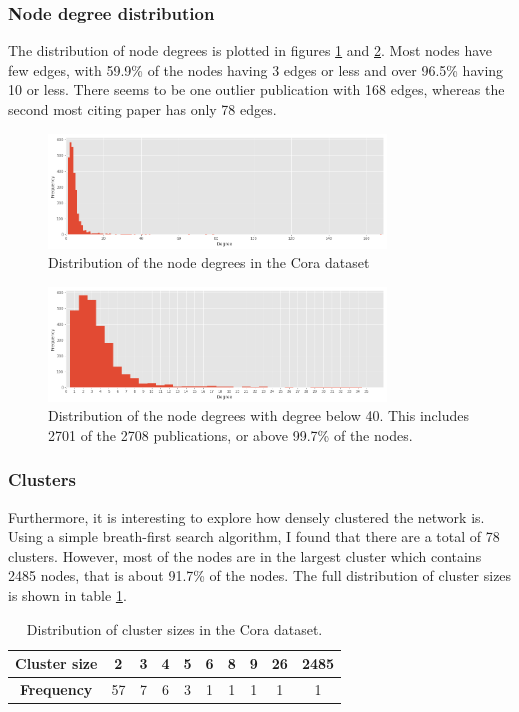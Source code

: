 \documentclass[12pt]{article}
\theoremstyle{definition}
\begin{document}
\subsubsection{Node degree distribution}
The distribution of node degrees is plotted in figures \ref{fig/node_degrees} and \ref{fig/node_degrees_truncated}. Most nodes have few edges, with 59.9\% of the nodes having 3 edges or less and over 96.5\% having 10 or less. There seems to be one outlier publication with 168 edges, whereas the second most citing paper has only 78 edges.

\begin{figure}[H]
	\includegraphics[width=0.8\textwidth]{node_degrees}
	\centering
	\caption{Distribution of the node degrees in the Cora dataset}
	\label{fig/node_degrees}
\end{figure}

\begin{figure}[H]
	\includegraphics[width=0.8\textwidth]{node_degrees_truncated}
	\centering
	\caption{Distribution of the node degrees with degree below 40. This includes 2701 of the 2708 publications, or above 99.7\% of the nodes.}
	\label{fig/node_degrees_truncated}
\end{figure}

\subsubsection{Clusters}
Furthermore, it is interesting to explore how densely clustered the network is. Using a simple breath-first search algorithm, I found that there are a total of 78 clusters. However, most of the nodes are in the largest cluster which contains 2485 nodes, that is about 91.7\% of the nodes. The full distribution of cluster sizes is shown in table \ref{table/cluster_sizes}.
\begin{table}[h]
\centering	
{\renewcommand{\arraystretch}{1.4} %
\begin{tabular}{ c | c c c c c c c c c}
\textbf{Cluster size} & 2  & 3 & 4 & 5 & 6 & 8 & 9 & 26 & 2485 \\
\hline
\textbf{Frequency} 	  & 57 & 7 & 6 & 3 & 1 & 1 & 1 & 1  & 1 \\
\end{tabular}
}
\caption{Distribution of cluster sizes in the Cora dataset.}
\label{table/cluster_sizes}
\end{table}
\end{document}

